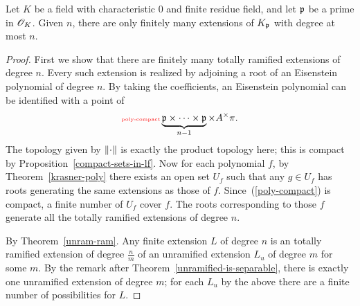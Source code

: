\begin{thm}
Let $K$ be a field with characteristic 0 and finite residue field, and let $\mathfrak{p}$ be a prime in $\mathscr{O}_K$. 
Given $n$, there are only finitely many %
extensions of $K_{\mathfrak{p}}$ with degree at most $n$.
\end{thm}
\begin{proof}
First we show that there are finitely many totally ramified extensions of degree $n$. Every such extension is realized by adjoining a root of an Eisenstein polynomial of degree $n$. By taking the coefficients, an Eisenstein polynomial can be identified with a point of 
\begin{equation}\llabel{poly-compact}
\underbrace{\mfp\times \cdots \times \mfp}_{n-1}\times A^{\times}\pi.
\end{equation}
The topology given by $\left\Vert {\cdot}\right\Vert$ is exactly the product topology here; this is compact by Proposition~\ref{compact-sets-in-lf}. Now for each polynomial $f$, by Theorem~\ref{krasner-poly} there exists an open set $U_f$ such that any $g\in U_f$ has roots generating the same extensions as those of $f$. Since~(\ref{poly-compact}) is compact, a finite number of $U_f$ cover $f$. The roots corresponding to those $f$ generate all the totally ramified extensions of degree $n$.

By Theorem~\ref{unram-ram}. Any finite extension $L$ of degree $n$ is an totally ramified extension of degree $\frac{n}{m}$ of an unramified extension $L_u$ of degree $m$ for some $m$. By the remark after Theorem~\ref{unramified-is-separable}, %
there is exactly one unramified extension of degree $m$; for each $L_u$ by the above there are a finite number of possibilities for $L$.
\end{proof}
